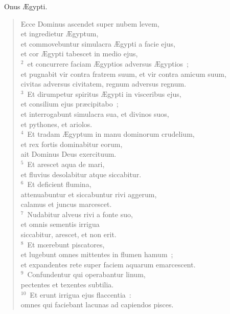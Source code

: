 ~Onus \AE gypti. \begin{flushleft}\begin{verse}\vspace{6pt}Ecce Dominus ascendet super nubem levem,\\ et ingredietur \AE gyptum,\\ et commovebuntur simulacra \AE gypti a facie ejus,\\ et cor \AE gypti tabescet in medio ejus,\\
${}^{2}$~et concurrere faciam \AE gyptios adversus \AE gyptios~;\\ et pugnabit vir contra fratrem suum, et vir contra amicum suum,\\ civitas adversus civitatem, regnum adversus regnum.\\
${}^{3}$~Et dirumpetur spiritus \AE gypti in visceribus ejus,\\ et consilium ejus pr\ae cipitabo~;\\ et interrogabunt simulacra sua, et divinos suos,\\ et pythones, et ariolos.\\
${}^{4}$~Et tradam \AE gyptum in manu dominorum crudelium,\\ et rex fortis dominabitur eorum,\\ ait Dominus Deus exercituum.\\
${}^{5}$~Et arescet aqua de mari,\\ et fluvius desolabitur atque siccabitur.\\
${}^{6}$~Et deficient flumina,\\ attenuabuntur et siccabuntur rivi aggerum,\\ calamus et juncus marcescet.\\
${}^{7}$~Nudabitur alveus rivi a fonte suo,\\ et omnis sementis irrigua\\ siccabitur, arescet, et non erit.\\
${}^{8}$~Et mœrebunt piscatores,\\ et lugebunt omnes mittentes in flumen hamum~;\\ et expandentes rete super faciem aquarum emarcescent.\\
${}^{9}$~Confundentur qui operabantur linum,\\ pectentes et texentes subtilia.\\
${}^{10}$~Et erunt irrigua ejus flaccentia~:\\ omnes qui faciebant lacunas ad capiendos pisces.\\

\end{verse}
\end{flushleft}
